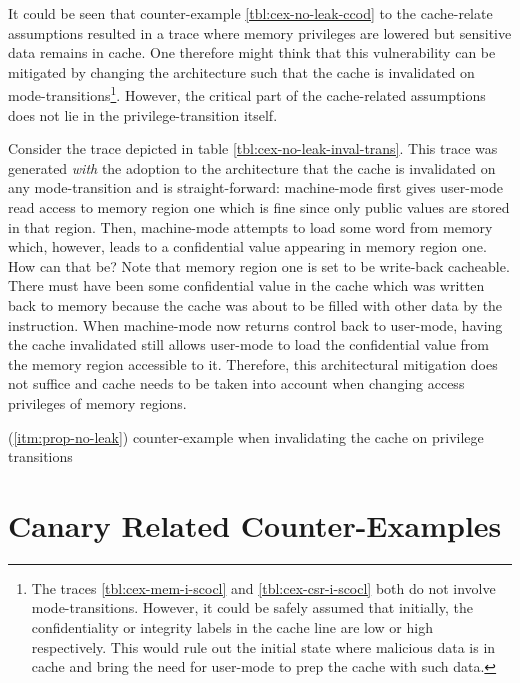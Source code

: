 It could be seen that counter-example \ref{tbl:cex-no-leak-ccod} to the cache-relate assumptions  resulted in a trace where memory privileges are lowered but sensitive data remains in cache.
One therefore might think that this vulnerability can be mitigated by changing the architecture such that the cache is invalidated on mode-transitions\footnote{%
    The traces \ref{tbl:cex-mem-i-scocl} and \ref{tbl:cex-csr-i-scocl} both do not involve mode-transitions.
    However, it could be safely assumed that initially, the confidentiality or integrity labels in the cache line are low or high respectively.
    This would rule out the initial state where malicious data is in cache and bring the need for user-mode to prep the cache with such data.
}.
However, the critical part of the cache-related assumptions does not lie in the privilege-transition itself.

Consider the trace depicted in table \ref{tbl:cex-no-leak-inval-trans}.
This trace was generated \textit{with} the adoption to the architecture that the cache is invalidated on any mode-transition and is straight-forward:
machine-mode first gives user-mode read access to memory region one which is fine since only public values are stored in that region.
Then, machine-mode attempts to load some word from memory which, however, leads to a confidential value appearing in memory region one.
How can that be?
Note that memory region one is set to be write-back cacheable.
There must have been some confidential value in the cache which was written back to memory because the cache was about to be filled with other data by the  instruction.
When machine-mode now returns control back to user-mode, having the cache invalidated still allows user-mode to load the confidential value from the memory region accessible to it.
Therefore, this architectural mitigation does not suffice and cache needs to be taken into account when changing access privileges of memory regions.

\begin{table}
    \centering
    
    \caption{ (\ref{itm:prop-no-leak}) counter-example when invalidating the cache on privilege transitions}
    \label{tbl:cex-no-leak-inval-trans}
\end{table}

\chapter{Canary Related Counter-Examples}
\label{app:cexs-canaries}

